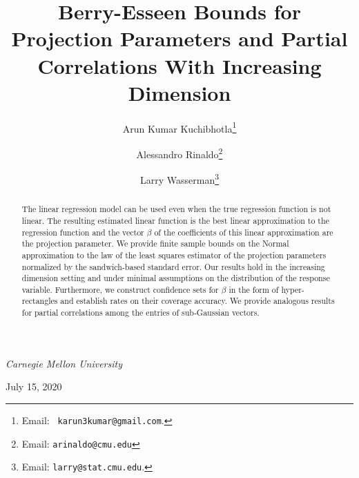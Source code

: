 \documentclass[11pt]{article}
\title{\bf Berry-Esseen Bounds for Projection Parameters and Partial Correlations With Increasing Dimension}
\author{
    Arun Kumar Kuchibhotla\thanks{Email: {\tt
            karun3kumar@gmail.com}.}
    \and
    Alessandro Rinaldo\thanks{Email: {\tt arinaldo@cmu.edu}}
    \and
    Larry Wasserman\thanks{Email: {\tt larry@stat.cmu.edu}.}
}
\begin{document}
\maketitle

{\centering
\vspace*{-0.5cm}
\textit{Carnegie Mellon University}\\
\par\bigskip
July 15, 2020
\par
}









\begin{abstract}
The linear regression model can be used even when
the true regression function is not linear.
The resulting estimated linear function is the best linear
approximation to the regression function and
the vector $\beta$ of the coefficients of this linear approximation
are the projection parameter.
We provide finite sample bounds
on the Normal approximation to the law of
the least squares estimator of the projection parameters
normalized by the sandwich-based standard error. Our results hold in the increasing dimension setting and under minimal assumptions on the distribution of the response variable.
Furthermore, we construct confidence sets 
for $\beta$ in the form of hyper-rectangles and establish rates on their coverage accuracy.
We provide analogous results for partial correlations among the entries of sub-Gaussian vectors. 
\end{abstract}
\end{document}
